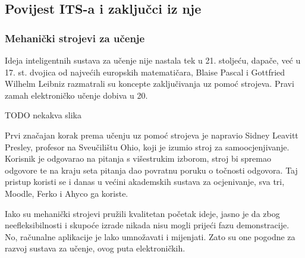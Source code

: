 \documentclass[times, utf8, zavrsni]{fer}
\begin{document}
\subsection{Povijest ITS-a i zaključci iz nje}

\subsubsection{Mehanički strojevi za učenje}
Ideja inteligentnih sustava za učenje nije nastala tek u 21. stoljeću, dapače, već u 17. st. dvojica od najvećih europskih matematičara, Blaise Pascal i Gottfried Wilhelm Leibniz razmatrali su koncepte zaključivanja uz pomoć strojeva. Pravi zamah elektroničko učenje dobiva u 20.
\par TODO nekakva slika 
\par
Prvi značajan korak prema učenju uz pomoć strojeva je napravio Sidney Leavitt Presley, profesor na Sveučilištu Ohio, koji je izumio stroj za samoocjenjivanje. Korisnik je odgovarao na pitanja s višestrukim izborom, stroj bi spremao odgovore te na kraju seta pitanja dao povratnu poruku o točnosti odgovora. Taj pristup koristi se i danas u većini akademskih sustava za ocjenivanje, sva tri, Moodle, Ferko i Ahyco ga koriste.
\par
Iako su mehanički strojevi pružili kvalitetan početak ideje, jasno je da zbog neefleksibilnosti i skupoće izrade nikada nisu mogli prijeći fazu demonstracije. No, računalne aplikacije je lako umnožavati i mijenjati. Zato su one pogodne za razvoj sustava za učenje, ovog puta elektroničkih.
\end{document}
